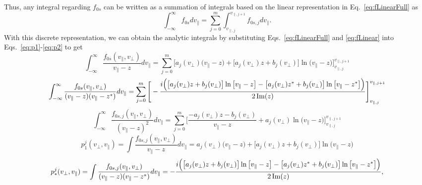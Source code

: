 Thus, any integral regarding $f_{0s}$ can be written as a summation of integrals based on the linear representation in Eq.~\ref{eq:fLinearFull} as
\begin{equation}
	\int_{-\infty}^\infty f_{0s} dv_\parallel = \sum_{j=0}^m \int_{v_{\parallel,j}}^{v_{\parallel,j+1}} f_{0s,j} dv_\parallel.
\end{equation}
With this discrete representation, we can obtain the analytic integrals by substituting Eqs.~\ref{eq:fLinearFull} and \ref{eq:fLinear} into Eqs.~\ref{eq:p1}-\ref{eq:p2} to get
\begin{equation}
	\int_{-\infty}^\infty \frac{f_{0s}(v_\parallel,v_\perp)}{v_\parallel - z} dv_\parallel = 
	\sum_{j=0}^m  \Bigg[ a_j(v_\perp) \big(v_\parallel-z\big) + \big[ a_j(v_\perp) z + b_j(v_\perp) ] \ln \big( v_\parallel - z \big) \Bigg]_{v_{\parallel,j}}^{v_{\parallel,j+1}}
	\label{eq:p1Linear}
\end{equation}
\begin{equation}
	\int_{-\infty}^\infty \frac{f_{0s}(v_\parallel,v_\perp)}{(v_\parallel - z)(v_\parallel - z^*)} dv_\parallel = \sum_{j=0}^m \Bigg[
	- \frac{i \Big( \big[ a_j(v_\perp)z + b_j(v_\perp)\big] \ln \big[ v_\parallel-z \big] - 
		\big[ a_j(v_\perp)z^* + b_j(v_\perp)\big] \ln \big[ v_\parallel-z^* \big] 
		\Big)  }{2 \operatorname{Im}(z)} \Bigg]_{v_{\parallel,j}}^{v_{\parallel,j+1}}
	\label{eq:pstarLinear}
\end{equation}
\begin{equation}
	\int_{-\infty}^\infty  \frac{f_{0s,j}(v_\parallel,v_\perp)}{(v_\parallel - z)^2} dv_\parallel = \sum_{j=0}^m \Bigg[
	\frac{-a_j(v_\perp)z - b_j(v_\perp)}{v_\parallel - z} + a_j(v_\perp) \ln\big(v_\parallel-z\big)\Bigg]_{v_{\parallel,j}}^{v_{\parallel,j+1}}
	\label{eq:p2Linear}
\end{equation}
\begin{equation}
	p_1^j (v_\perp, v_\parallel) = \int \frac{f_{0s,j}(v_\parallel,v_\perp)}{v_\parallel - z} dv_\parallel = 
	a_j(v_\perp) \big(v_\parallel-z\big) + \big[ a_j(v_\perp) z + b_j(v_\perp) ] \ln \big( v_\parallel - z \big)
	\label{eq:p1j}
\end{equation}
\begin{equation}
	p_*^j (v_\perp, v_\parallel) =\int \frac{f_{0s,j}(v_\parallel,v_\perp)}{(v_\parallel - z)(v_\parallel - z^*)} dv_\parallel = 
	- \frac{i \Big( \big[ a_j(v_\perp)z + b_j(v_\perp)\big] \ln \big[ v_\parallel-z \big] - 
		\big[ a_j(v_\perp)z^* + b_j(v_\perp)\big] \ln \big[ v_\parallel-z^* \big] 
		\Big)  }{2 \operatorname{Im}(z)},
	\label{eq:pstarj}
\end{equation}
